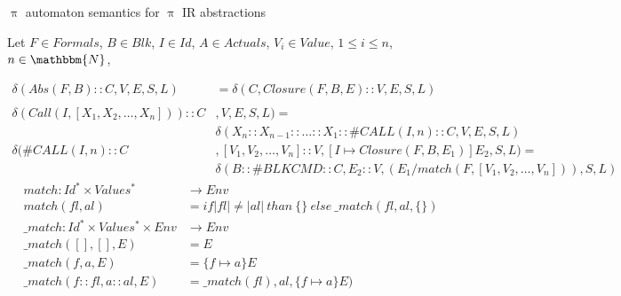 \documentclass{beamer}
\begin{document}
\begin{frame}{{\color{red}$\uppi$ automaton} semantics for {\color{red}$\uppi$ IR} abstractions}



Let $F \in \mathit{Formals}$, $B \in Blk$, $I \in \mathit{Id}$, $A \in \mathit{Actuals}$, $V_i \in \mathit{Value}$, $1 \le i \le n$, $n \in \mathbbm{N}$,

\begin{tiny}
\begin{align}
\delta(\mathit{Abs}(F, B) :: C, V, E, S, L) & = \delta(C, \mathit{Closure}(F, B, E) :: V, E, S, L) \\ \nonumber \\
\delta(\mathit{Call}(I, [X_1, X_2, \ldots, X_n])) :: C & , V, E, S, L) = \\ \nonumber
	& \delta(X_n :: X_{n-1} :: \ldots :: X_1 :: \#\mathit{CALL}(I, n) :: C, V, E, S, L) \\
\delta(\#\mathit{CALL}(I, n) ::C & , [V_1, V_2, \ldots, V_n] :: V, [I \mapsto \mathit{Closure}(F, B, E_1)] E_2, S, L) = \\ \nonumber
	& \delta(B :: \#BLKCMD :: C, E_2 :: V, (E_1 / \mathit{match}(F,  [V_1, V_2, \ldots, V_n])), S, L) 
\end{align}
\begin{align*}	
\mathit{match} : \mathit{Id^*} \times \mathit{Values^*} & \to \mathit{Env} \\ 
\mathit{match}(fl, al) & = \mathit{if} |fl| \not= |al| \ \mathit{than} \ \{\} \ \mathit{else} \ \_\mathit{match}(fl, al, \{\}) \\
\_\mathit{match} : \mathit{Id^*} \times \mathit{Values^* } \times \mathit{Env} & \to \mathit{Env} \\ 
\_\mathit{match}([], [], E) & = E \\
\_\mathit{match}(f, a, E)  & = \{f \mapsto a\} E \\
\_\mathit{match}(f :: fl, a :: al, E) & = \_\mathit{match}(fl), al, \{f \mapsto a\} E) 
\end{align*}
\end{tiny}

\end{frame}
\end{document}
